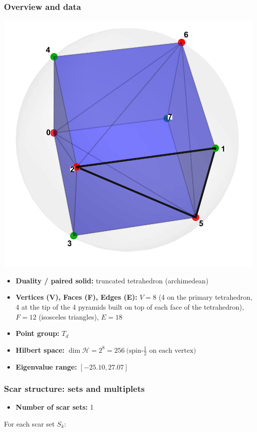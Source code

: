 \documentclass[11pt,a4paper]{article}
\begin{document}
\subsubsection*{Overview and data}
\begin{center}
  \includegraphics[width=.6\linewidth]{triakistetrahedron}
\end{center}

\begin{itemize}[leftmargin=1.5em]
  \item \textbf{Duality / paired solid:} truncated tetrahedron (archimedean)
  \item \textbf{Vertices (V), Faces (F), Edges (E):} $V = 8$ (4 on the primary tetrahedron, 4 at the tip of the 4 pyramids built on top of each face of the tetrahedron),\; $F = 12$ (isosceles triangles),\; $E = 18$
  \item \textbf{Point group:} $T_d$
  \item \textbf{Hilbert space:} \(
        \dim\mathcal{H} = 2^{8} = 256\ \text{(spin-$\tfrac12$ on each vertex)}
        \)
  \item \textbf{Eigenvalue range:} $[-25.10, 27.07]$
\end{itemize}

\subsubsection*{Scar structure: sets and multiplets}

\begin{itemize}[leftmargin=1.5em]
  \item \textbf{Number of scar sets:} 1
  \end{itemize}
  \hspace{6mm}For each scar set $S_k$:\\
\end{document}
